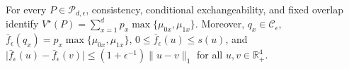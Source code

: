 For every \(P\in\mathcal P_{d,\epsilon}\), consistency, conditional exchangeability, and fixed overlap identify \(V^\star(P)=\sum_{x=1}^dp_x\max\{\mu_{0x},\mu_{1x}\}\). Moreover, \(q_x\in\mathcal C_\epsilon\), \(\bar f_\epsilon(q_x)=p_x\max\{\mu_{0x},\mu_{1x}\}\), \(0\leq\bar f_\epsilon(u)\leq s(u)\), and \(\lvert\bar f_\epsilon(u)-\bar f_\epsilon(v)\rvert\leq(1+\epsilon^{-1})\lVert u-v\rVert_1\) for all \(u,v\in\mathbb R_+^4\).